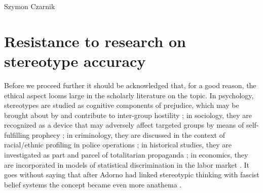 \begin{artengenv}{Szymon Czarnik}
\section{Resistance to research on stereotype accuracy}
Before we proceed further it should be acknowledged that, for a good reason, the ethical aspect looms large in the scholarly literature on the topic. In psychology, stereotypes are studied as cognitive components of prejudice, which may be brought about by and contribute to inter-group hostility
\parencite[][]{bar-tal_delegitimization_1989}; %
 in sociology, they are recognized as a device that may adversely affect targeted groups by means of self-fulfilling prophecy 
\parencite[][]{merton_self-fulfilling_1948}; %
 in criminology, they are discussed in the context of racial/ethnic profiling in police operations 
\parencite[][]{schauer_profiles_2003}; %
 in historical studies, they are investigated as part and parcel of totalitarian propaganda 
\parencites[][]{werth_dekulakisation_2011}[][]{ushmm_united_states_holocaust_memorial_museum_defining_nodate}%
; in economics, they are incorporated in models of statistical discrimination in the labor market 
\parencites[][]{arrow_theory_1971}[][]{phelps_statistical_1972}. %
 It goes without saying that after Adorno had linked stereotypic thinking with fascist belief systems the concept became even more anathema 
\parencite[][]{jones_stereotypes_2001}.%



\end{artengenv}
